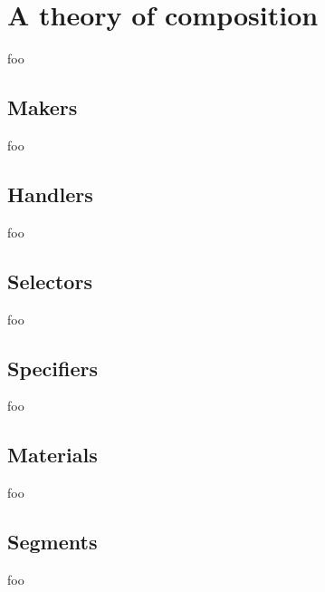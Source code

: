\chapter{A theory of composition}

foo

\section{Makers}

foo

\section{Handlers}

foo

\section{Selectors}

foo

\section{Specifiers}

foo

\section{Materials}

foo

\section{Segments}

foo
